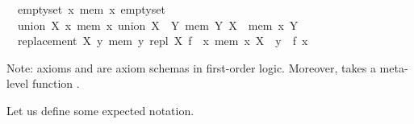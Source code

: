 \begin{isabellebody}
\ \ emptyset{\isacharcolon}{\kern0pt}\ {\isachardoublequoteopen}{\isasymnot}{\isacharparenleft}{\kern0pt}{\isasymexists}x{\isachardot}{\kern0pt}\ mem\ x\ emptyset{\isacharparenright}{\kern0pt}{\isachardoublequoteclose}\ \isanewline
\ \ union{\isacharcolon}{\kern0pt}\ {\isachardoublequoteopen}{\isasymforall}X\ x{\isachardot}{\kern0pt}\ mem\ x\ {\isacharparenleft}{\kern0pt}union\ X{\isacharparenright}{\kern0pt}\ {\isasymlongleftrightarrow}\ {\isacharparenleft}{\kern0pt}{\isasymexists}Y{\isachardot}{\kern0pt}\ mem\ Y\ X\ {\isasymand}\ mem\ x\ Y{\isacharparenright}{\kern0pt}{\isachardoublequoteclose}\ \isanewline
\ \ replacement{\isacharcolon}{\kern0pt}\ {\isachardoublequoteopen}{\isasymforall}X\ y{\isachardot}{\kern0pt}\ mem\ y\ {\isacharparenleft}{\kern0pt}repl\ X\ f{\isacharparenright}{\kern0pt}\ {\isasymlongleftrightarrow}\ {\isacharparenleft}{\kern0pt}{\isasymexists}x{\isachardot}{\kern0pt}\ mem\ x\ X\ {\isasymand}\ y\ {\isacharequal}{\kern0pt}\ f\ x{\isacharparenright}{\kern0pt}{\isachardoublequoteclose}%
\begin{isamarkuptext}%
Note: axioms  and  are axiom schemas
in first-order logic. Moreover,  takes a meta-level function .%
\end{isamarkuptext}\isamarkuptrue%
%
\begin{isamarkuptext}%
Let us define some expected notation.%

\end{isamarkuptext}
\end{isabellebody}
